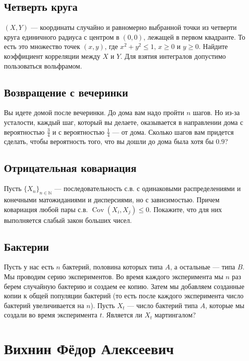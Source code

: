 \documentclass[12pt]{article}
\newcommand\N{\mathbb{N}}
\DeclareMathOperator{\Cov}{Cov}
\begin{document}
\subsection{Четверть круга}

$(X, Y)$ --- координаты случайно и равномерно выбранной точки из четверти круга единичного радиуса с центром в $(0, 0)$, лежащей в первом квадранте. То есть это множество точек $(x, y)$, где $x^2 + y^2 \le 1$, $x \ge 0$ и $y \ge 0$. Найдите коэффициент корреляции между $X$ и $Y$. Для взятия интегралов  допустимо пользоваться вольфрамом.


\subsection{Возвращение с вечеринки}

Вы идете домой после вечеринки. До дома вам надо пройти $n$ шагов. Но из-за усталости, каждый шаг, который вы делаете, оказывается в направлении дома с вероятностью $\frac{3}{4}$ и с вероятностью $\frac{1}{4}$ --- от дома. Сколько шагов вам придется сделать, чтобы вероятность того, что вы дошли до дома была хотя бы $0.9$?

\subsection{Отрицательная ковариация}

Пусть $\{X_n\}_{n \in \N}$ --- последовательность с.в. с одинаковыми распределениями и конечными матожиданиями и дисперсиями, но с зависимостью. Причем ковариация любой пары с.в. $\Cov(X_i, X_j) \le 0$. Покажите, что для них выполняется слабый закон больших чисел.


\subsection{Бактерии}

Пусть у нас есть $n$ бактерий, половина которых типа $A$, а остальные --- типа $B$. Мы проводим серию экспериментов. Во время каждого эксперимента мы $n$ раз берем случайную бактерию и создаем ее копию. Затем мы добавляем созданные копии к общей популяции бактерий (то есть после каждого эксперимента число бактерий увеличивается на $n$). Пусть $X_t$ --- число бактерий типа $A$, которые мы создали во время эксперимента $t$. Является ли $X_t$ мартингалом?


\newpage
\section{Вихнин Фёдор Алексеевич}
\end{document}
